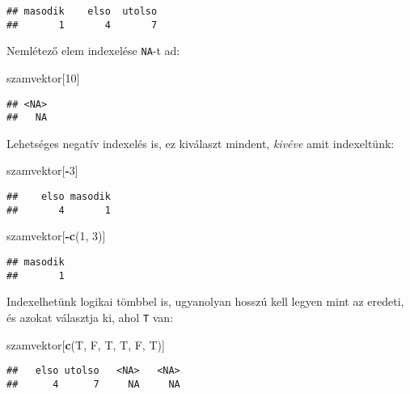 \documentclass[
]{book}
\newenvironment{Shaded}{\begin{snugshade}}{\end{snugshade}}
\newcommand{\DecValTok}[1]{\textcolor[rgb]{0.00,0.00,0.81}{#1}}
\newcommand{\KeywordTok}[1]{\textcolor[rgb]{0.13,0.29,0.53}{\textbf{#1}}}
\newcommand{\NormalTok}[1]{#1}
\newcommand{\OperatorTok}[1]{\textcolor[rgb]{0.81,0.36,0.00}{\textbf{#1}}}
\begin{document}
\begin{verbatim}
## masodik    elso  utolso 
##       1       4       7
\end{verbatim}

Nemlétező elem indexelése \texttt{NA}-t ad:

\begin{Shaded}
\begin{Highlighting}[]
\NormalTok{szamvektor[}\DecValTok{10}\NormalTok{]}
\end{Highlighting}
\end{Shaded}

\begin{verbatim}
## <NA> 
##   NA
\end{verbatim}

Lehetséges negatív indexelés is, ez kiválaszt mindent, \emph{kivéve} amit indexeltünk:

\begin{Shaded}
\begin{Highlighting}[]
\NormalTok{szamvektor[}\OperatorTok{-}\DecValTok{3}\NormalTok{]}
\end{Highlighting}
\end{Shaded}

\begin{verbatim}
##    elso masodik 
##       4       1
\end{verbatim}

\begin{Shaded}
\begin{Highlighting}[]
\NormalTok{szamvektor[}\OperatorTok{-}\KeywordTok{c}\NormalTok{(}\DecValTok{1}\NormalTok{, }\DecValTok{3}\NormalTok{)]}
\end{Highlighting}
\end{Shaded}

\begin{verbatim}
## masodik 
##       1
\end{verbatim}

Indexelhetünk logikai tömbbel is, ugyanolyan hosszú kell legyen mint az eredeti, és azokat választja ki, ahol \texttt{T} van:

\begin{Shaded}
\begin{Highlighting}[]
\NormalTok{szamvektor[}\KeywordTok{c}\NormalTok{(T, F, T, T, F, T)]}
\end{Highlighting}
\end{Shaded}

\begin{verbatim}
##   elso utolso   <NA>   <NA> 
##      4      7     NA     NA
\end{verbatim}
\end{document}
